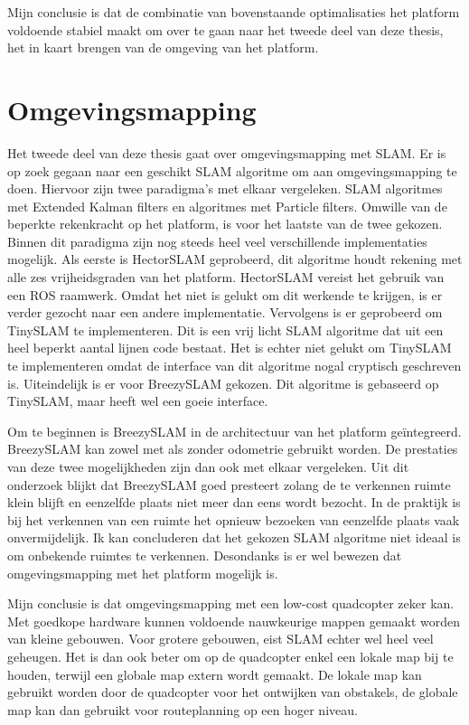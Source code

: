 \npar Mijn conclusie is dat de combinatie van bovenstaande optimalisaties het platform voldoende stabiel maakt om over te gaan naar het tweede deel van deze thesis, het in kaart brengen van de omgeving van het platform.

\section{Omgevingsmapping} \label{sec:concSLAM}
\npar Het tweede deel van deze thesis gaat over omgevingsmapping met SLAM. Er is op zoek gegaan naar een geschikt SLAM algoritme om aan omgevingsmapping te doen. Hiervoor zijn twee paradigma's met elkaar vergeleken. SLAM algoritmes met Extended Kalman filters en algoritmes met Particle filters. Omwille van de beperkte rekenkracht op het platform, is voor het laatste van de twee gekozen. Binnen dit paradigma zijn nog steeds heel veel verschillende implementaties mogelijk. Als eerste is {HectorSLAM} geprobeerd, dit algoritme houdt rekening met alle zes vrijheidsgraden van het platform. {HectorSLAM} vereist het gebruik van een ROS raamwerk. Omdat het niet is gelukt om dit werkende te krijgen, is er verder gezocht naar een andere implementatie. Vervolgens is er geprobeerd om {TinySLAM} te implementeren. Dit is een vrij licht SLAM algoritme dat uit een heel beperkt aantal lijnen code bestaat. Het is echter niet gelukt om {TinySLAM} te implementeren omdat de interface van dit algoritme nogal cryptisch geschreven is. Uiteindelijk is er voor {BreezySLAM} gekozen. Dit algoritme is gebaseerd op {TinySLAM}, maar heeft wel een goeie interface.

\npar Om te beginnen is {BreezySLAM} in de architectuur van het platform ge\"integreerd. {BreezySLAM} kan zowel met als zonder odometrie gebruikt worden. De prestaties van deze twee mogelijkheden zijn dan ook met elkaar vergeleken. Uit dit onderzoek blijkt dat {BreezySLAM} goed presteert zolang de te verkennen ruimte klein blijft en eenzelfde plaats niet meer dan eens wordt bezocht. In de praktijk is bij het verkennen van een ruimte het opnieuw bezoeken van eenzelfde plaats vaak onvermijdelijk. Ik kan concluderen dat het gekozen SLAM algoritme niet ideaal is om onbekende ruimtes te verkennen. Desondanks is er wel bewezen dat omgevingsmapping met het platform mogelijk is.

\npar Mijn conclusie is dat omgevingsmapping met een low-cost quadcopter zeker kan. Met goedkope hardware kunnen voldoende nauwkeurige mappen gemaakt worden van kleine gebouwen. Voor grotere gebouwen, eist SLAM echter wel heel veel geheugen. Het is dan ook beter om op de quadcopter enkel een lokale map bij te houden, terwijl een globale map extern wordt gemaakt. De lokale map kan gebruikt worden door de quadcopter voor het ontwijken van obstakels, de globale map kan dan gebruikt voor routeplanning op een hoger niveau. 

